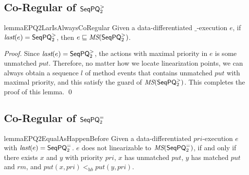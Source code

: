 \subsection{Co-Regular of $\mathsf{SeqPQ}_2^{>}$}
\label{subsec:appendix co-regular of EPQ2Lar}


\begin{restatable}{lemma}{EPQ2LarIsAlwaysCoRegular}
\label{lemma:EPQ2Lar is always co-regular}
Given a data-differentiated $\_$-execution $e$, if $\textit{last}(e) = \mathsf{SeqPQ}_2^{>}$, then $e \sqsubseteq \textit{MS}(\mathsf{SeqPQ}_2^{>})$.
\end{restatable}

\begin {proof}
Since $\textit{last}(e) = \mathsf{SeqPQ}_2^{>}$, the actions with maximal priority in $e$ is some unmatched $\textit{put}$. Therefore, no matter how we locate linearization points, we can always obtain a sequence $l$ of method events that contains unmatched $\textit{put}$ with maximal priority, and this satisfy the guard of $\textit{MS}(\mathsf{SeqPQ}_2^{>})$. This completes the proof of this lemma. \qed
\end {proof}




\subsection{Co-Regular of $\mathsf{SeqPQ}_2^{=}$}
\label{subsec:appendix co-regular of EPQ2Equal}

\begin{restatable}{lemma}{EPQ2EqualAsHappenBefore}
\label{lemma:EPQ2Equal as happen before}
Given a data-differentiated $\textit{pri}$-execution $e$ with $\textit{last}(e) = \mathsf{SeqPQ}_2^{=}$. $e$ does not linearizable to $\textit{MS}(\mathsf{SeqPQ}_2^{=})$, if and only if there exists $x$ and $y$ with priority $\textit{pri}$, $x$ has unmatched $\textit{put}$, $y$ has matched $\textit{put}$ and $\textit{rm}$, and $\textit{put}(x,\textit{pri}) <_{\textit{hb}} \textit{put}(y,\textit{pri})$.
\end{restatable}

